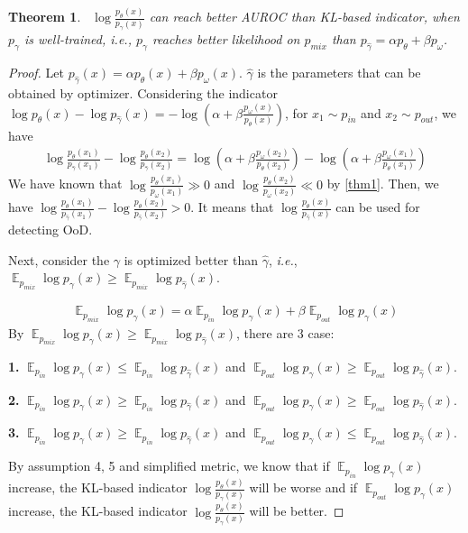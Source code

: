 \documentclass[a3paper]{article}
\newtheorem{theorem}{Theorem}
\newtheorem*{proof}{\it{Proof.}\rm}
\newcommand{\IE}{\textit{i.e.}, }
\newcommand{\E}{\operatorname{\mathbb{E}}}
\newcommand{\pin}{p_{in}}
\newcommand{\pout}{p_{out}}
\newcommand{\pmix}{p_{mix}}
\begin{document}
\begin{theorem}~\label{thm5}
	$\log \frac{p_\theta(x)}{p_\gamma(x)}$ can reach better AUROC than KL-based indicator, when $p_\gamma$ is well-trained, \IE $p_\gamma$ reaches better likelihood on $\pmix$ than $p_{\hat{\gamma}} = \alpha p_{\theta} + \beta p_{\omega}$. 
\end{theorem}
\begin{proof}\rm
	Let $p_{\hat{\gamma}}(x) = \alpha p_\theta(x) + \beta p_\omega(x)$. $\hat{\gamma}$ is the parameters that can be obtained by optimizer. 
	Considering the indicator $\log p_\theta(x) - \log p_{\hat{\gamma}}(x) = -\log (\alpha + \beta \frac{p_\omega(x)}{p_\theta(x)})$, for $x_1 \sim \pin$ and $x_2 \sim \pout$, we have 
	\begin{align*}
		\log \frac{p_\theta(x_1)}{p_{\hat{\gamma}}(x_1)} - \log \frac{p_\theta(x_2)}{p_{\hat{\gamma}}(x_2)} = \log (\alpha + \beta \frac{p_\omega(x_2)}{p_\theta(x_2)}) - \log (\alpha + \beta \frac{p_\omega(x_1)}{p_\theta(x_1)})
	\end{align*}
	We have known that $\log \frac{p_\theta(x_1)}{p_\omega(x_1)} \gg 0$ and $\log \frac{p_\theta(x_2)}{p_\omega(x_2)} \ll 0$ by \cref{thm1}. Then, we have $\log \frac{p_\theta(x_1)}{p_{\hat{\gamma}}(x_1)} - \log \frac{p_\theta(x_2)}{p_{\hat{\gamma}}(x_2)} > 0$. It means that $\log \frac{p_\theta(x)}{p_{\hat{\gamma}}(x)}$ can be used for detecting OoD.
	
	Next, consider the $\gamma$ is optimized better than $\hat{\gamma}$, \IE $\E_{\pmix} \log p_\gamma(x) \geq \E_{\pmix} \log p_{\hat{\gamma}}(x)$. 
	
	\begin{align*}
		\E_{\pmix} \log p_\gamma(x) = \alpha \E_{\pin} \log p_\gamma(x) + \beta \E_{\pout} \log p_\gamma(x)
	\end{align*}
	By $\E_{\pmix} \log p_\gamma(x) \geq \E_{\pmix} \log p_{\hat{\gamma}}(x)$, there are 3 case:
	
	\textbf{1.} $\E_{\pin} \log p_\gamma(x) \leq \E_{\pin} \log p_{\hat\gamma}(x)$ and $\E_{\pout} \log p_\gamma(x) \geq \E_{\pout} \log p_{\hat\gamma}(x)$. 
	
	\textbf{2.} $\E_{\pin} \log p_\gamma(x) \geq \E_{\pin} \log p_{\hat\gamma}(x)$ and $\E_{\pout} \log p_\gamma(x) \geq \E_{\pout} \log p_{\hat\gamma}(x)$. 
	
	
	\textbf{3.} $\E_{\pin} \log p_\gamma(x) \geq \E_{\pin} \log p_{\hat\gamma}(x)$ and $\E_{\pout} \log p_\gamma(x) \leq \E_{\pout} \log p_{\hat\gamma}(x)$. 
	
	By assumption 4, 5 and simplified metric, we know that if  $\E_{\pin} \log p_\gamma(x)$ increase, the KL-based indicator $\log \frac{p_\theta(x)}{p_{{\gamma}}(x)}$ will be worse and if  $\E_{\pout} \log p_\gamma(x)$ increase, the KL-based indicator $\log \frac{p_\theta(x)}{p_{{\gamma}}(x)}$ will be better. 
	

\end{proof}
\end{document}
